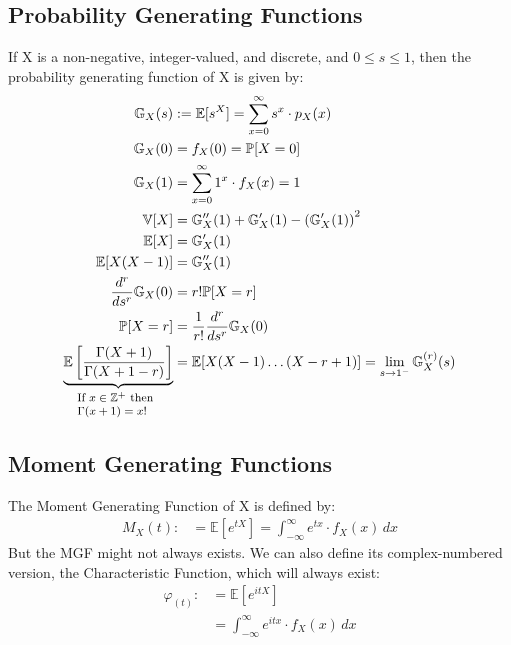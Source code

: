 \subsection{Probability Generating Functions}
If X is a non-negative, integer-valued, and discrete, and $0 \le s \le 1$, then
the probability generating function of X is given by:
\begin{equation*}
    \begin{aligned}
        \mathbb{G}_X(s) &:= \mathbb{E}[s^X] = \sum_{x = 0}^\infty s^x \cdot
        p_X(x)\\
        \mathbb{G}_X(0)  &= f_X(0) = \mathbb{P}[X=0] \\
        \mathbb{G}_X(1)  &= \sum_{x = 0}^\infty 1^x \cdot f_X(x) = 1 \\
        \mathbb{V}[X] &= \mathbb{G}_X''(1) + \mathbb{G}_X'(1) - \left(\mathbb{G}_X'(1)\right)^2 \\
        \mathbb{E}[X] &= \mathbb{G}_X'(1)  \\
        \mathbb{E}[X(X-1)] &= \mathbb{G}_X''(1)  \\
        \frac{d^r}{ds^r} \mathbb{G}_X(0) &= r!\mathbb{P}[X = r] \\
        \mathbb{P}[X = r] &= \frac{1}{r!}\frac{d^r}{ds^r} \mathbb{G}_X(0) \\
        \explain{\mathbb{E} \left[ \frac{ \Gamma(X + 1) }{ \Gamma(X+1-r) }
\right]}{If $x\in\mathbb{Z}^+$ then $\Gamma(x+1) = x!$} 
                          &= \mathbb{E}[X(X-1) \ldots (X-r+1)]
                          = \lim_{s\to1^{-}} \mathbb{G}_X^{(r)}(s) \\
    \end{aligned}
\end{equation*}

\subsection{Moment Generating Functions}
The Moment Generating Function of X is defined by:
\begin{equation*}
    \begin{aligned}
        M_X(t) :&= \mathbb{E}[e^{tX}] = \int_{-\infty}^{\infty} e^{tx} \cdot f_X(x) \,dx 
    \end{aligned}
\end{equation*}
But the MGF might not always exists. We can also define its complex-numbered
version, the Characteristic Function, which will always exist:
\begin{equation*}
    \begin{aligned}
        \varphi_(t) :&= \mathbb{E}[e^{itX}] \\
                &= \int_{-\infty}^{\infty} e^{itx} \cdot f_X(x) \,dx 
    \end{aligned}
\end{equation*}

